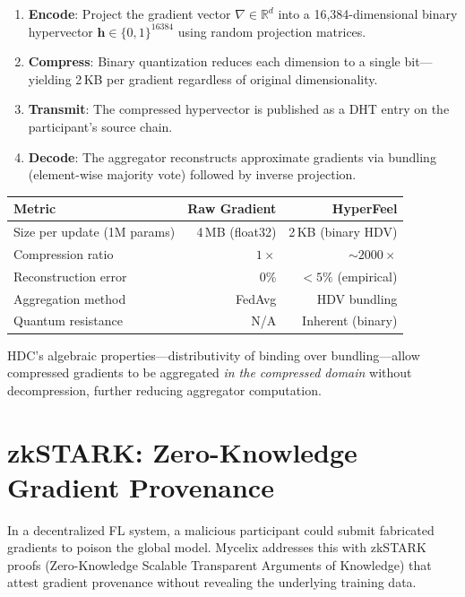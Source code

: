 \documentclass[12pt]{book}
\begin{document}
\begin{enumerate}
  \item \textbf{Encode}: Project the gradient vector $\nabla \in \mathbb{R}^d$
    into a 16,384-dimensional binary hypervector $\mathbf{h} \in \{0,1\}^{16384}$
    using random projection matrices.
  \item \textbf{Compress}: Binary quantization reduces each dimension to
    a single bit---yielding 2\,KB per gradient regardless of original
    dimensionality.
  \item \textbf{Transmit}: The compressed hypervector is published as a
    DHT entry on the participant's source chain.
  \item \textbf{Decode}: The aggregator reconstructs approximate gradients
    via bundling (element-wise majority vote) followed by inverse projection.
\end{enumerate}

\begin{longtable}{lrr}
\toprule
\textbf{Metric} & \textbf{Raw Gradient} & \textbf{HyperFeel} \\
\midrule
\endhead
Size per update (1M params) & 4\,MB (float32) & 2\,KB (binary HDV) \\
Compression ratio           & $1\times$        & $\sim 2000\times$ \\
Reconstruction error        & 0\%              & $< 5\%$ (empirical) \\
Aggregation method          & FedAvg           & HDV bundling \\
Quantum resistance          & N/A              & Inherent (binary) \\
\bottomrule
\end{longtable}

HDC's algebraic properties---distributivity of binding over bundling---allow
compressed gradients to be aggregated \emph{in the compressed domain}
without decompression, further reducing aggregator computation.

\section{zkSTARK: Zero-Knowledge Gradient Provenance}

In a decentralized FL system, a malicious participant could submit
fabricated gradients to poison the global model.  Mycelix addresses
this with zkSTARK proofs (Zero-Knowledge Scalable Transparent Arguments
of Knowledge) that attest gradient provenance without revealing the
underlying training data.
\end{document}
